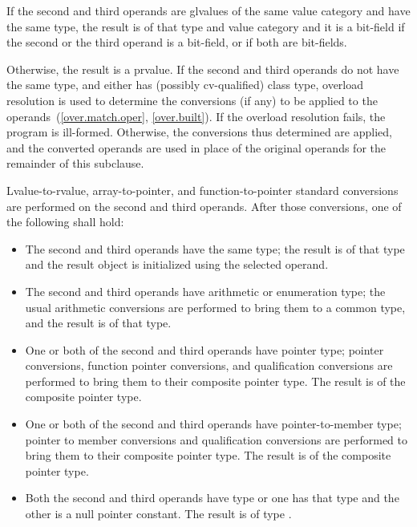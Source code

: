 \pnum
If the second and third operands are glvalues of the same value category
and have the same type, the
result is of that type and value category and it is a bit-field if the
second or the third operand is a bit-field, or if both are bit-fields.

\pnum
Otherwise, the result is a prvalue. If the second and third operands do
not have the same type, and either has (possibly cv-qualified) class
type, overload resolution is used to determine the conversions (if any)
to be applied to the operands~(\ref{over.match.oper}, \ref{over.built}).
If the overload resolution fails, the program is ill-formed. Otherwise,
the conversions thus determined are applied, and the converted operands
are used in place of the original operands for the remainder of this
subclause.

\pnum
Lvalue-to-rvalue, array-to-pointer,
and function-to-pointer standard conversions are
performed on the second and third operands. After those conversions, one
of the following shall hold:

\begin{itemize}
\item The second and third operands have the same type; the result is of
that type and the result object is initialized using the selected operand.

\item The second and third operands have arithmetic or enumeration type;
the usual arithmetic conversions are performed to bring them to a common
type, and the result is of that type.

\item One or both of the second and third operands have pointer type;
pointer conversions,
function pointer conversions, and
qualification conversions
are performed to bring them to their
composite pointer type. The result is of the composite
pointer type.

\item One or both of the second and third operands have pointer-to-member type;
pointer to member conversions and qualification
conversions are performed to bring them to their composite
pointer type. The result is of the composite pointer type.

\item
Both the second and third operands have type  or one has
that type and the other is a null pointer constant. The result is of type
.

\end{itemize}

